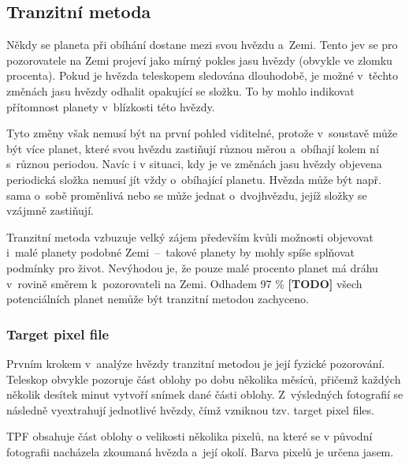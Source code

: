 \documentclass[a4paper,12pt]{article}
\begin{document}

\dataplot

\clearpage
\subsection{Tranzitní metoda}

Někdy se planeta při obíhání dostane mezi svou hvězdu a~Zemi. Tento jev se pro pozorovatele na Zemi projeví jako mírný pokles jasu hvězdy (obvykle ve zlomku procenta). Pokud je hvězda teleskopem sledována dlouhodobě, je možné v~těchto změnách jasu hvězdy odhalit opakující se složku. To by mohlo indikovat přítomnost planety v~blízkosti této hvězdy.

\drawgimp

Tyto změny však nemusí být na první pohled viditelné, protože v~soustavě může být více planet, které svou hvězdu zastiňují různou měrou a~obíhají kolem ní s~různou periodou. Navíc i v situaci, kdy je ve změnách jasu hvězdy objevena periodická složka nemusí jít vždy o~obíhající planetu. Hvězda může být např. sama o~sobě proměnlivá nebo se může jednat o~dvojhvězdu, jejíž složky se vzájmně zastiňují.

Tranzitní metoda vzbuzuje velký zájem především kvůli možnosti objevovat i~malé planety podobné Zemi~--~takové planety by mohly spíše splňovat podmínky pro život. Nevýhodou je, že pouze malé procento planet má dráhu v~rovině směrem k~pozorovateli na Zemi. Odhadem 97 \% \textbf{[TODO]} všech potenciálních planet nemůže být tranzitní metodou zachyceno.

\subsubsection{Target pixel file}

Prvním krokem v~analýze hvězdy tranzitní metodou je její fyzické pozorování. Teleskop obvykle pozoruje část oblohy po dobu několika měsíců, přičemž každých několik desítek minut vytvoří snímek dané části oblohy. Z~výsledných fotografií se následně vyextrahují jednotlivé hvězdy, čímž vzniknou tzv. target pixel files.

TPF obsahuje část oblohy o velikosti několika pixelů, na které se v původní fotografii nacházela zkoumaná hvězda a~její okolí. Barva pixelů je určena jasem.

\end{document}
